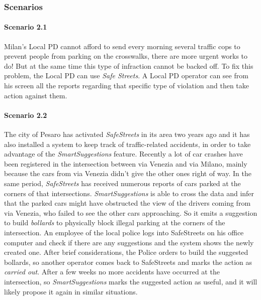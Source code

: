 \subsubsection{Scenarios}

\paragraph{Scenario 2.1}
Milan's Local PD cannot afford to send every morning several traffic cops to
prevent people from parking on the crosswalks, there are more urgent works to
do! But at the same time this type of infraction cannot be backed off. To fix
this problem, the Local PD can use \emph{Safe Streets}. A Local PD operator can
see from his screen all the reports regarding that specific type of violation
and then take action against them.

\paragraph{Scenario 2.2}
The city of Pesaro has activated \emph{SafeStreets} in its area two years ago
and it has also installed a system to keep track of traffic-related accidents,
in order to take advantage of the \emph{SmartSuggestions} feature.
Recently a lot of car crashes have been registered in the intersection between
via Venezia and via Milano, mainly because the cars from via Venezia didn't give
the other ones right of way.
In the same period, \emph{SafeStreets} has received numerous reports of cars
parked at the corners of that intersections.
\emph{SmartSuggestions} is able to cross the data and infer that the parked cars
might have obstructed the view of the drivers coming from via Venezia, who
failed to see the other cars approaching. So it emits a suggestion to build
\emph{bollards} to physically block illegal parking at the corners of the
intersection.
An employee of the local police logs into SafeStreets on his office computer and
check if there are any suggestions and the system shows the newly created one.
After brief considerations, the Police orders to build the suggested bollards,
so another operator comes back to SafeStreets and marks the action as
\emph{carried out}.
After a few weeks no more accidents have occurred at the intersection, so
\emph{SmartSuggestions} marks the suggested action as useful, and it will likely
propose it again in similar situations.